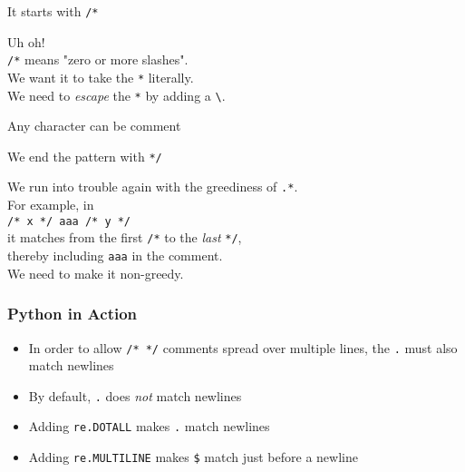 \begin{frame}
\begin{overprint}
    \begin{center}
      It starts with \texttt{/*}
    \end{center}

    \begin{center}
      Uh oh! \\
      \texttt{/*} means "zero or more slashes". \\
      We want it to take the \texttt{*} literally. \\
      We need to \emph{escape} the \texttt{*} by adding a \texttt{\textbackslash}.
    \end{center}

    \begin{center}
      Any character can be comment
    \end{center}

    \begin{center}
      We end the pattern with \texttt{*/}
    \end{center}

    \begin{center}
      We run into trouble again with the greediness of \texttt{.*}. \\
      For example, in \\ \texttt{/* x */ aaa /* y */} \\ it matches from the first \texttt{/*} to the \emph{last} \texttt{*/}, \\ thereby including \texttt{aaa} in the comment. \\
      We need to make it non-greedy.
    \end{center}
  \end{overprint}
\end{frame}

\begin{frame}
  \frametitle{Python in Action}
  \begin{itemize}
    \item In order to allow \texttt{/* */} comments spread over multiple lines, the \texttt{.} must also match newlines
    \item By default, \texttt{.} does \emph{not} match newlines
    \item Adding \texttt{re.DOTALL} makes \texttt{.} match newlines
    \item Adding \texttt{re.MULTILINE} makes \texttt{\$} match just before a newline
  \end{itemize}
\end{frame}

